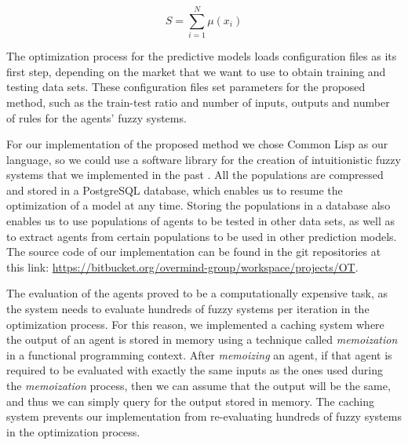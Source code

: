 \documentclass{ieeeaccess}
\begin{document}
\begin{equation}
  \label{equation:activation-score}
  S =\sum_{i=1}^{N}{\mu(x_{i})}
\end{equation}

The optimization process for the predictive models loads configuration files as its first step, depending on the market that we want to use to obtain training and testing data sets. These configuration files set parameters for the proposed method, such as the train-test ratio and number of inputs, outputs and number of rules for the agents' fuzzy systems.

For our implementation of the proposed method we chose Common Lisp as our language, so we could use a software library for the creation of intuitionistic fuzzy systems that we implemented in the past \cite{Hernandez-Aguila2016} \cite{Hernandez-Aguila2017-2}. All the populations are compressed and stored in a PostgreSQL database, which enables us to resume the optimization of a model at any time. Storing the populations in a database also enables us to use populations of agents to be tested in other data sets, as well as to extract agents from certain populations to be used in other prediction models. The source code of our implementation can be found in the git repositories at this link: \url{https://bitbucket.org/overmind-group/workspace/projects/OT}.

The evaluation of the agents proved to be a computationally expensive task, as the system needs to evaluate hundreds of fuzzy systems per iteration in the optimization process. For this reason, we implemented a caching system where the output of an agent is stored in memory using a technique called \textit{memoization} \cite{johnson1995memoization} in a functional programming context. After \textit{memoizing} an agent, if that agent is required to be evaluated with exactly the same inputs as the ones used during the \textit{memoization} process, then we can assume that the output will be the same, and thus we can simply query for the output stored in memory. The caching system prevents our implementation from re-evaluating hundreds of fuzzy systems in the optimization process.

\end{document}
